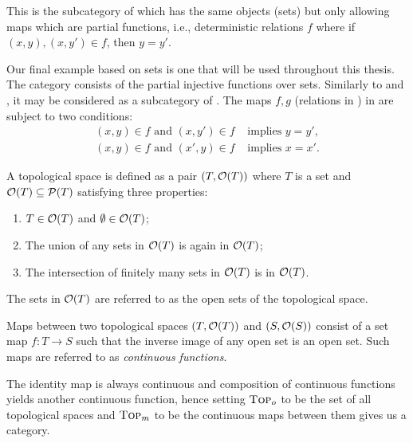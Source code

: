 \begin{example}[\Par]\label{ex:category_par}
This is the subcategory of \rel which has the same  objects (sets) but only allowing maps which are
partial functions, i.e., deterministic relations $f$ where if $(x,y), (x,y') \in f$, then $y = y'$.
\end{example}


\begin{example}[\pinj]\label{ex:category_pinj}
Our final example based on sets is one that will be used throughout this thesis. The category \pinj consists of
the partial injective functions over sets. Similarly to \sets and \Par, it may be considered as a subcategory
of \rel. The maps $f,g$ (relations in \rel) in \pinj are subject to two conditions:
\begin{align}
   (x,y)\in f\text{ and }(x,y')\in f & \text{ implies } y = y',\label{eq:pinj_relation_is_a_function}\\
   (x,y)\in f\text{ and }(x',y)\in f & \text{ implies } x = x'.\label{eq:pinj_converse_relation_is_a_function}
\end{align}
\end{example}

\begin{example}[\topcat]\label{ex:category_top}
  A topological space is defined as a pair $(T,\mathcal{O}({T}))$ where $T$ is a set and $\mathcal{O}({T}) \subseteq
  \mathcal{P}(T)$ satisfying three properties:
  \begin{enumerate}[{(}i{)}]
    \item $T\in \mathcal{O}({T})$ and $\emptyset \in \mathcal{O}({T})$;
    \item The union of any sets in $\mathcal{O}({T})$ is again in $\mathcal{O}({T})$;
    \item The intersection of finitely many sets in $\mathcal{O}({T})$ is in $\mathcal{O}({T})$.
  \end{enumerate}
  The sets in $\mathcal{O}({T})$ are referred to as the open sets of the topological space.

  Maps between two topological spaces $(T,\mathcal{O}({T}))$ and $(S,\mathcal{O}({S}))$ consist of
  a set map $f:T \to S$ such that the inverse image of any open set  is an open set. Such
  maps are referred to as \emph{continuous functions}.

  The identity map is always continuous and composition of continuous functions yields another
  continuous function, hence setting $\textsc{Top}_o$ to be the set of all topological spaces and
  $\textsc{Top}_m$ to be the continuous maps between them gives us a category.
\end{example}

